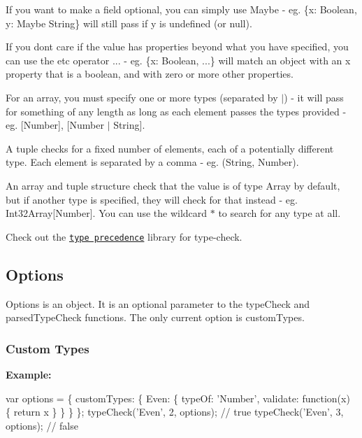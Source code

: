 If you want to make a field optional, you can simply use {\ttfamily Maybe} -\/ eg. {\ttfamily \{x\+: Boolean, y\+: Maybe String\}} will still pass if {\ttfamily y} is undefined (or null).

If you don\textquotesingle{}t care if the value has properties beyond what you have specified, you can use the \textquotesingle{}etc\textquotesingle{} operator {\ttfamily ...} -\/ eg. {\ttfamily \{x\+: Boolean, ...\}} will match an object with an {\ttfamily x} property that is a boolean, and with zero or more other properties.

For an array, you must specify one or more types (separated by {\ttfamily $\vert$}) -\/ it will pass for something of any length as long as each element passes the types provided -\/ eg. {\ttfamily \mbox{[}Number\mbox{]}}, {\ttfamily \mbox{[}Number $\vert$ String\mbox{]}}.

A tuple checks for a fixed number of elements, each of a potentially different type. Each element is separated by a comma -\/ eg. {\ttfamily (String, Number)}.

An array and tuple structure check that the value is of type {\ttfamily Array} by default, but if another type is specified, they will check for that instead -\/ eg. {\ttfamily Int32\+Array\mbox{[}Number\mbox{]}}. You can use the wildcard {\ttfamily $\ast$} to search for any type at all.

Check out the \href{https://github.com/zaboco/type-precedence}{\tt type precedence} library for type-\/check.

\subsection*{Options}

Options is an object. It is an optional parameter to the {\ttfamily type\+Check} and {\ttfamily parsed\+Type\+Check} functions. The only current option is {\ttfamily custom\+Types}.

\label{_custom-types}%
 \subsubsection*{Custom Types}

{\bfseries Example\+:}


\begin{DoxyCode}
var options = \{
  customTypes: \{
    Even: \{
      typeOf: \textcolor{stringliteral}{'Number'},
      validate: \textcolor{keyword}{function}(x) \{
        \textcolor{keywordflow}{return} x %
      \}
    \}
  \}
\};
typeCheck(\textcolor{stringliteral}{'Even'}, 2, options); \textcolor{comment}{// true}
typeCheck(\textcolor{stringliteral}{'Even'}, 3, options); \textcolor{comment}{// false}
\end{DoxyCode}


